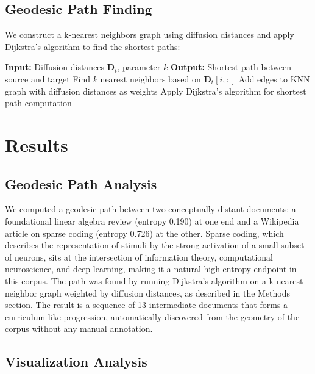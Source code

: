 \documentclass[12pt,a4paper]{article}
\begin{document}
\subsection{Geodesic Path Finding}

We construct a k-nearest neighbors graph using diffusion distances and apply Dijkstra's algorithm \cite{djikstra} to find the shortest paths:

\begin{algorithm}
\caption{Geodesic Path Finding}
\begin{algorithmic}
\STATE \textbf{Input:} Diffusion distances $\mathbf{D}_t$, parameter $k$
\STATE \textbf{Output:} Shortest path between source and target
    \STATE Find $k$ nearest neighbors based on $\mathbf{D}_t[i,:]$
    \STATE Add edges to KNN graph with diffusion distances as weights
\ENDFOR
\STATE Apply Dijkstra's algorithm for shortest path computation
\end{algorithmic}
\end{algorithm}

\section{Results}

\subsection{Geodesic Path Analysis}

We computed a geodesic path between two conceptually distant documents: a foundational linear algebra review (entropy 0.190) at one end and a Wikipedia article on sparse coding (entropy 0.726) at the other. Sparse coding, which describes the representation of stimuli by the strong activation of a small subset of neurons, sits at the intersection of information theory, computational neuroscience, and deep learning, making it a natural high-entropy endpoint in this corpus. The path was found by running Dijkstra's algorithm on a k-nearest-neighbor graph weighted by diffusion distances, as described in the Methods section. The result is a sequence of 13 intermediate documents that forms a curriculum-like progression, automatically discovered from the geometry of the corpus without any manual annotation.

\subsection{Visualization Analysis}
\end{document}
